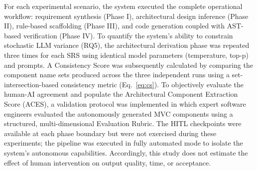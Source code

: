For each experimental scenario, the system executed the complete operational workflow: requirement synthesis
(Phase I), architectural design inference (Phase II), rule-based scaffolding (Phase III), and code generation coupled
with AST-based verification (Phase IV). To quantify the system’s ability to constrain stochastic LLM variance
(RQ5), the architectural derivation phase was repeated three times for each SRS using identical model parameters
(temperature, top-p) and prompts. A Consistency Score was subsequently calculated by comparing the component name sets produced across the three independent runs using a set-intersection-based consistency metric (Eq.~\ref{eq:cs}).
To objectively evaluate the human-AI agreement and populate the Architectural Component Extraction Score (ACES), a validation protocol was implemented in which expert software engineers evaluated the autonomously generated MVC components using a structured, multi-dimensional Evaluation Rubric. The HITL checkpoints were available at each phase boundary but were not exercised during these experiments; the pipeline was executed in fully automated mode to isolate the system's autonomous capabilities. Accordingly, this study does not estimate the effect of human intervention on output quality, time, or acceptance.


